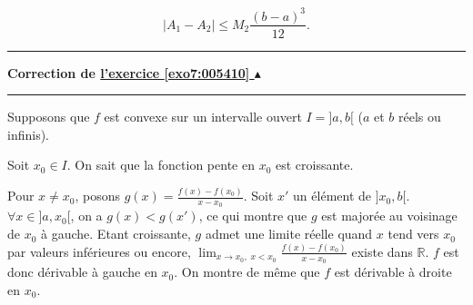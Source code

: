 \documentclass[11pt,a4paper]{article}
\newcommand{\Rr}{\mathbb{R}} \newcommand{\R}{\mathbb{R}}
\newcounter{exo}
\newcommand{\correction}[1]{\hypertarget{cor7:#1}{}\label{cor7:#1}{\bf Correction de \hyperlink{exo7:#1}{l'exercice \ref{exo7:#1} $\blacktriangle$}}\vspace{1mm}\hrule\vspace{1mm}}
\newcommand{\fincorrection}{\vspace{1mm}\hrule\vspace*{7mm}}
\begin{document}
$$|A_1-A_2|\leq M_2\frac{(b-a)^3}{12}.$$


\fincorrection
\correction{005410}
Supposons que $f$ est convexe sur un intervalle ouvert $I=]a,b[$ ($a$ et $b$ réels ou infinis).

Soit $x_0\in I$. On sait que la fonction pente en $x_0$ est croissante.

Pour $x\neq x_0$, posons $g(x)=\frac{f(x)-f(x_0)}{x-x_0}$. Soit $x'$ un élément de $]x_0,b[$. $\forall x\in]a,x_0[$, on a $g(x)<g(x')$, ce qui montre que $g$ est majorée au voisinage de $x_0$ à gauche. Etant croissante, $g$ admet une limite réelle quand $x$ tend vers $x_0$ par valeurs inférieures ou encore, $\lim_{x\rightarrow x_0,\;x<x_0}\frac{f(x)-f(x_0)}{x-x_0}$ existe dans $\Rr$. $f$ est donc dérivable à gauche en $x_0$. On montre de même que $f$ est dérivable à droite en $x_0$.
\end{document}
